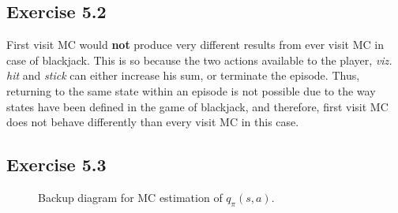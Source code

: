 \documentclass[10pt]{article}
\begin{document}
 	\subsection*{Exercise 5.2} 
 	\label{ss:5.2}
 	First visit MC would \textbf{not} produce very different results from ever visit MC in case of blackjack. This is so because the two actions available to the player, \emph{viz.} \emph{hit} and \emph{stick} can either increase his sum, or terminate the episode. Thus, returning to the same state within an episode is not possible due to the way states have been defined in the game of blackjack, and therefore, first visit MC does not behave differently than every visit MC in this case.
 	\subsection*{Exercise 5.3} 
 	\label{ss:5.3}
 	\begin{figure}[H]
 		\centering
 		\caption{Backup diagram for MC estimation of $q_\pi(s,a)$.}
 	\end{figure}
\end{document}

